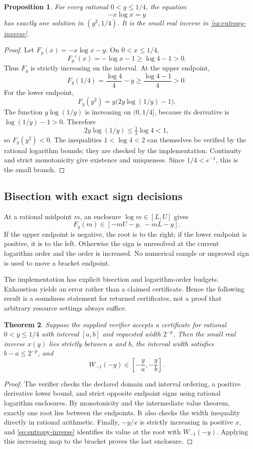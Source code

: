 \documentclass[11pt,letterpaper]{article}
\newtheorem{proposition}{Proposition}[section]
\newtheorem{theorem}[proposition]{Theorem}
\begin{document}
\begin{proposition}\label{prop:bracket}
For every rational $0<y\le1/4$, the equation
\[
 -x\log x=y
\]
has exactly one solution in $(y^2,1/4)$. It is the small real inverse in \eqref{eq:entropy-inverse}.
\end{proposition}
\begin{proof}
Let $F_y(x)=-x\log x-y$. On $0<x\le1/4$,
\[
 F_y'(x)=-\log x-1\ge\log4-1>0.
\]
Thus $F_y$ is strictly increasing on the interval. At the upper endpoint,
\[
 F_y(1/4)=\frac{\log4}{4}-y
 \ge\frac{\log4-1}{4}>0.
\]
For the lower endpoint,
\[
 F_y(y^2)=y\bigl(2y\log(1/y)-1\bigr).
\]
The function $y\log(1/y)$ is increasing on $(0,1/4]$, because its derivative is $\log(1/y)-1>0$. Therefore
\[
 2y\log(1/y)\le\tfrac12\log4<1,
\]
so $F_y(y^2)<0$. The inequalities $1<\log4<2$ can themselves be verified by the rational logarithm bounds; they are checked by the implementation. Continuity and strict monotonicity give existence and uniqueness. Since $1/4<e^{-1}$, this is the small branch.
\end{proof}

\subsection{Bisection with exact sign decisions}

At a rational midpoint $m$, an enclosure $\log m\in[L,U]$ gives
\[
 F_y(m)\in[-mU-y,\,-mL-y].
\]
If the upper endpoint is negative, the root is to the right; if the lower endpoint is positive, it is to the left. Otherwise the sign is unresolved at the current logarithm order and the order is increased. No numerical sample or unproved sign is used to move a bracket endpoint.

The implementation has explicit bisection and logarithm-order budgets. Exhaustion yields an error rather than a claimed certificate. Hence the following result is a soundness statement for returned certificates, not a proof that arbitrary resource settings always suffice.

\begin{theorem}\label{thm:cert}
Suppose the supplied verifier accepts a certificate for rational $0<y\le1/4$ with interval $[a,b]$ and requested width $2^{-p}$. Then the small real inverse $x(y)$ lies strictly between $a$ and $b$, the interval width satisfies $b-a\le2^{-p}$, and
\[
 W_{-1}(-y)\in\left[-\frac{y}{a},-\frac{y}{b}\right].
\]
\end{theorem}
\begin{proof}
The verifier checks the declared domain and interval ordering, a positive derivative lower bound, and strict opposite endpoint signs using rational logarithm enclosures. By monotonicity and the intermediate value theorem, exactly one root lies between the endpoints. It also checks the width inequality directly in rational arithmetic. Finally, $-y/x$ is strictly increasing in positive $x$, and \eqref{eq:entropy-inverse} identifies its value at the root with $W_{-1}(-y)$. Applying this increasing map to the bracket proves the last enclosure.
\end{proof}
\end{document}
